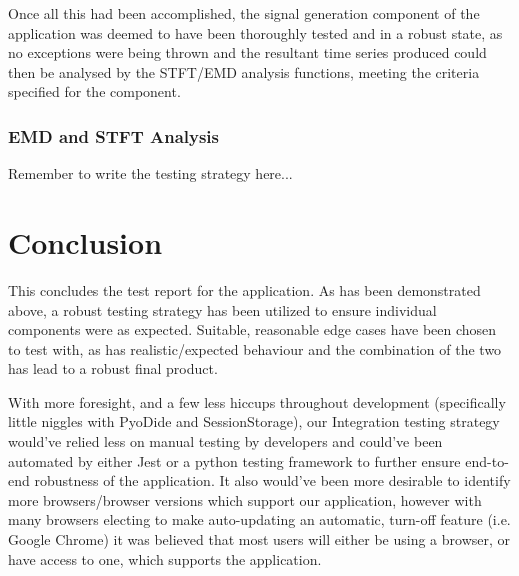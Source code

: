 Once all this had been accomplished, the signal generation component of the application was deemed to have been thoroughly tested and in a robust state, as no exceptions were being thrown and the resultant time series produced could then be analysed by the STFT/EMD analysis functions, meeting the criteria specified for the component. 

\subsubsection{EMD and STFT Analysis}

Remember to write the testing strategy here...

\section{Conclusion}
This concludes the test report for the application. As has been demonstrated above, a robust testing strategy has been utilized to ensure individual components were as expected. Suitable, reasonable edge cases have been chosen to test with, as has realistic/expected behaviour and the combination of the two has lead to a robust final product.

With more foresight, and a few less hiccups throughout development (specifically little niggles with PyoDide and SessionStorage), our Integration testing strategy would've relied less on manual testing by developers and could've been automated by either Jest or a python testing framework to further ensure end-to-end robustness of the application. It also would've been more desirable to identify more browsers/browser versions which support our application, however with many browsers electing to make auto-updating an automatic, turn-off feature (i.e. Google Chrome) it was believed that most users will either be using a browser, or have access to one, which supports the application.